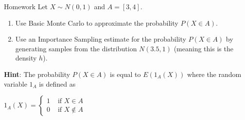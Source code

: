 \documentclass[8pt]{beamer}
\begin{document}

       
      

\begin{frame}{Homework}
Let $X \sim N(0,1)$ and $A=[3,4]$. 
\begin{enumerate}
	\item Use Basic Monte Carlo to approximate the probability $P(X \in A)$.
	\item Use an Importance Sampling estimate for the probability  $P(X \in A)$ by generating samples from the distribution  $N(3.5, 1)$ (meaning this is the density $h$).
\end{enumerate}
\textbf{Hint}: The probability $P(X \in A)$ is equal to $E(1_A(X))$ where the random variable $1_A$ is defined as
\vspace{2mm}

$1_A(X)=\left\{\begin{array}{ll} 1& \text{ if } X \in A\\
0 & \text{ if } X \notin A \end{array} \right.
$
\end{frame}
\end{document}
